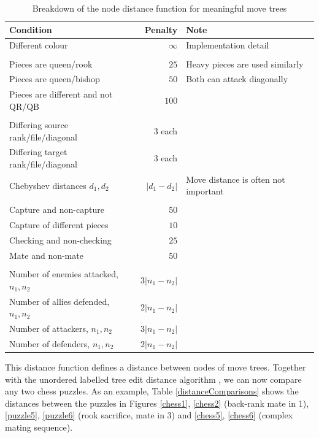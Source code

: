 \begin{table}[H]
  \centering
  \begin{tabular}{lrl}
      Condition & Penalty & Note \\
      \hline
      Different colour & $\infty$ & Implementation detail \\
      &&\\
      Pieces are queen/rook & $25$ & Heavy pieces are used similarly \\
      Pieces are queen/bishop& $50$ & Both can attack diagonally \\
      Pieces are different and not QR/QB& $100$ & \\
      &&\\
      Differing source rank/file/diagonal & $3$ each & \\
      Differing target rank/file/diagonal & $3$ each & \\
      Chebyshev distances $d_1, d_2$ & $|d_1-d_2|$ & Move distance is often
      not important \\
      &&\\
      Capture and non-capture & $50$ & \\
      Capture of different pieces & $10$ & \\
      Checking and non-checking & $25$ & \\
      Mate and non-mate & $50$ & \\
      &&\\
      Number of enemies attacked, $n_1, n_2$ & $3|n_1-n_2|$ & \\
      Number of allies defended, $n_1, n_2$ & $2|n_1-n_2|$ & \\
      Number of attackers, $n_1, n_2$ & $3|n_1-n_2|$ & \\
      Number of defenders, $n_1, n_2$ & $2|n_1-n_2|$ & \\
  \end{tabular}
  \caption{Breakdown of the node distance function for meaningful move trees}
  \label{distanceTable}
\end{table}

This distance function defines a distance between nodes of move trees. Together
with the unordered labelled tree edit distance algorithm \citep{editDistTrees},
we can now compare any two chess puzzles. As an example, Table
\ref{distanceComparisons} shows the distances between the puzzles in Figures
\ref{chess1}, \ref{chess2} (back-rank mate in 1), \ref{puzzle5}, \ref{puzzle6}
(rook sacrifice, mate in 3) and \ref{chess5}, \ref{chess6} (complex mating sequence).

